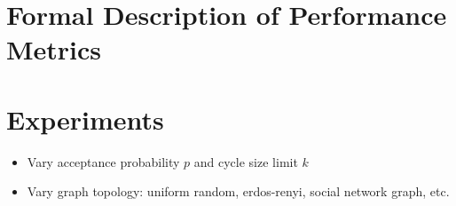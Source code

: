 \documentclass[main.tex]{subfiles}
\begin{document}
\section{Formal Description of Performance Metrics}

\section{Experiments}

\begin{itemize}
  \item Vary acceptance probability $p$ and cycle size limit $k$
  \item Vary graph topology: uniform random, erdos-renyi, social network graph, etc.
\end{itemize}
\end{document}
